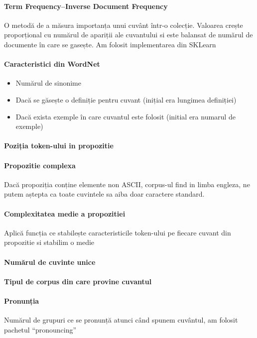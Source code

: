 \documentclass{article}
\begin{document}
\paragraph{Term Frequency–Inverse Document Frequency} O metodă de a măsura importanța unui cuvânt într-o
colecție. Valoarea crește proporțional cu numărul de apariții
ale cuvantului si este balansat de numărul de documente în care
se gasește. Am folosit implementarea din SKLearn
\paragraph{Caracteristici din WordNet}
\begin{itemize}
  \item Numărul de sinonime
  \item Dacă se găsește o definiție pentru cuvant (inițial era lungimea definiției)
  \item Dacă exista exemple în care cuvantul este folosit (initial era numarul de exemple)
\end{itemize}
\paragraph{Poziția token-ului in propozitie}
\paragraph{Propozitie complexa} Dacă propoziția conține elemente non ASCII, corpus-ul find in limba engleza, ne putem aștepta ca toate cuvintele sa aiba doar caractere standard.
\paragraph{Complexitatea medie a propozitiei} Aplică funcția ce stabilește caracteristicile token-ului pe fiecare cuvant din propozitie si stabilim o medie
\paragraph{Numărul de cuvinte unice}
\paragraph{Tipul de corpus din care provine cuvantul}
\paragraph{Pronunția} Numărul de grupuri ce se pronunță atunci când spunem cuvântul, am folosit pachetul ``pronouncing''
 
\end{document}
